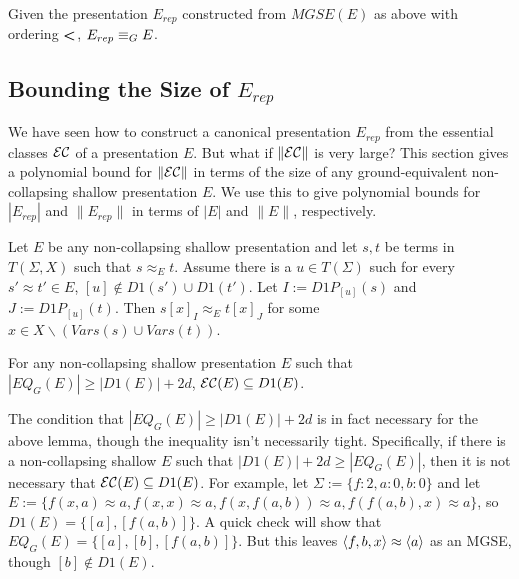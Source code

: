 \begin{proposition}
\label{erep}
Given the presentation $E_{rep}$ constructed from  $MGSE(E)$ as above with ordering $\textbf{\textless}$, $E_{rep} \equiv_G E$.
\end{proposition}



\subsection{Bounding the Size of $E_{rep}$}

We have seen how to construct a canonical presentation $E_{rep}$ from the essential classes ${\mathcal{E}\mathcal{C}}$ of a presentation $E$.
 But what if $\|{\mathcal{E}\mathcal{C}}\|$ is very large?
 This section gives a polynomial bound for $\|{\mathcal{E}\mathcal{C}}\|$ in terms of the size of any ground-equivalent non-collapsing shallow presentation $E$.
 We use this to give polynomial bounds for $|E_{rep}|$ and $\|E_{rep}\|$ in terms of $|E|$ and $\|E\|$, respectively.

\begin{lemma}
\label{d_one_lemma}
Let $E$ be any non-collapsing shallow presentation and let $s, t$ be terms in $T(\Sigma, X)$ such that $s \approx_E t$.
Assume there is a $u \in T(\Sigma)$ such for every $s' \approx t' \in E$, $[u]\not\in D1(s') \cup D1(t')$. %
Let $I := D1P_{[u]}(s)$ and $J := D1P_{[u]}(t)$.
Then $s[x]_I \approx_E t[x]_J$ for some $x \in X \backslash (Vars(s) \cup Vars(t))$. 
\end{lemma}


\begin{lemma}
\label{eq_d1}
For any non-collapsing shallow presentation $E$ such that $|EQ_G(E)| \ge |D1(E)| + 2d$, ${\mathcal{E}\mathcal{C}}(E) \subseteq D1(E)$.
\end{lemma}


The condition that $|EQ_G(E)| \ge |D1(E)| + 2d$ is in fact necessary for the above lemma, though the inequality isn't necessarily tight.
Specifically, if there is a non-collapsing shallow $E$ such that $|D1(E)| + 2d \ge |EQ_G(E)|$, then it is not necessary that ${\mathcal{E}\mathcal{C}}(E) \subseteq D1(E)$.
For example, let $\Sigma := \{ f:2, a:0, b:0 \}$ and let $E := \{ f(x,a)\approx a, f(x,x)\approx a, f(x,f(a,b))\approx a, f(f(a,b),x)\approx a\}$, so $D1(E) = \{ [a], [f(a,b)]\}$.
A quick check will show that $EQ_G(E) = \{ [a], [b], [f(a,b)]\}$. 
But this leaves $\langle f,b,x \rangle\approx \langle a \rangle$ as an MGSE, though $[b] \not\in D1(E)$.

